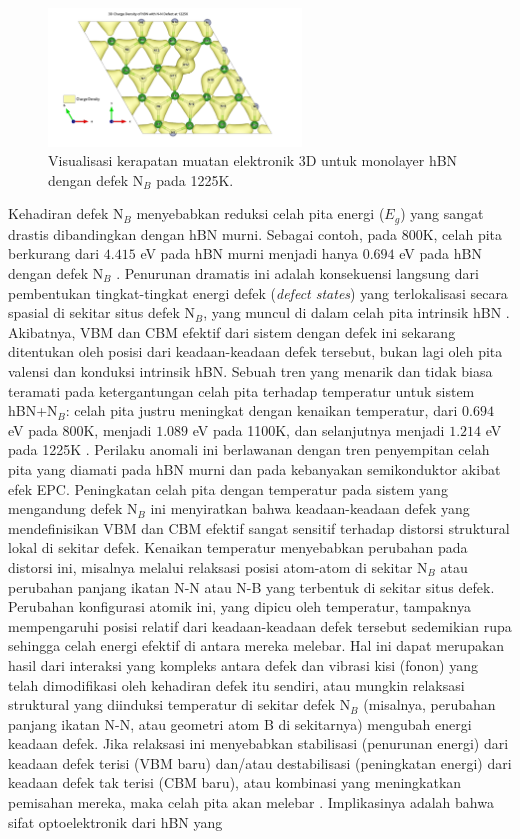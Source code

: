 \begin{figure}[h!]
    \centering
    \includegraphics[width=0.6\textwidth]{gambar_hasil/hBN_rho_3D_NN_1225K.png}
    \caption{Visualisasi kerapatan muatan elektronik 3D untuk monolayer hBN dengan defek N$_B$ pada 1225K.}
    \label{fig:hbn_NN_1225K_chargedensity}
\end{figure}

Kehadiran defek N$_B$ menyebabkan reduksi celah pita energi ($E_g$) yang sangat drastis dibandingkan dengan hBN murni. Sebagai contoh, pada 800K, celah pita berkurang dari $4.415$ eV pada hBN murni menjadi hanya $0.694$ eV pada hBN dengan defek N$_B$ . Penurunan dramatis ini adalah konsekuensi langsung dari pembentukan tingkat-tingkat energi defek (\textit{defect states}) yang terlokalisasi secara spasial di sekitar situs defek N$_B$, yang muncul di dalam celah pita intrinsik hBN . Akibatnya, VBM dan CBM efektif dari sistem dengan defek ini sekarang ditentukan oleh posisi dari keadaan-keadaan defek tersebut, bukan lagi oleh pita valensi dan konduksi intrinsik hBN. Sebuah tren yang menarik dan tidak biasa teramati pada ketergantungan celah pita terhadap temperatur untuk sistem hBN+N$_B$: celah pita justru meningkat dengan kenaikan temperatur, dari $0.694$ eV pada 800K, menjadi $1.089$ eV pada 1100K, dan selanjutnya menjadi $1.214$ eV pada 1225K . Perilaku anomali ini berlawanan dengan tren penyempitan celah pita yang diamati pada hBN murni dan pada kebanyakan semikonduktor akibat efek EPC. Peningkatan celah pita dengan temperatur pada sistem yang mengandung defek N$_B$ ini menyiratkan bahwa keadaan-keadaan defek yang mendefinisikan VBM dan CBM efektif sangat sensitif terhadap distorsi struktural lokal di sekitar defek. Kenaikan temperatur menyebabkan perubahan pada distorsi ini, misalnya melalui relaksasi posisi atom-atom di sekitar N$_B$ atau perubahan panjang ikatan N-N atau N-B yang terbentuk di sekitar situs defek. Perubahan konfigurasi atomik ini, yang dipicu oleh temperatur, tampaknya mempengaruhi posisi relatif dari keadaan-keadaan defek tersebut sedemikian rupa sehingga celah energi efektif di antara mereka melebar. Hal ini dapat merupakan hasil dari interaksi yang kompleks antara defek dan vibrasi kisi (fonon) yang telah dimodifikasi oleh kehadiran defek itu sendiri, atau mungkin relaksasi struktural yang diinduksi temperatur di sekitar defek N$_B$ (misalnya, perubahan panjang ikatan N-N, atau geometri atom B di sekitarnya) mengubah energi keadaan defek. Jika relaksasi ini menyebabkan stabilisasi (penurunan energi) dari keadaan defek terisi (VBM baru) dan/atau destabilisasi (peningkatan energi) dari keadaan defek tak terisi (CBM baru), atau kombinasi yang meningkatkan pemisahan mereka, maka celah pita akan melebar . Implikasinya adalah bahwa sifat optoelektronik dari hBN yang 